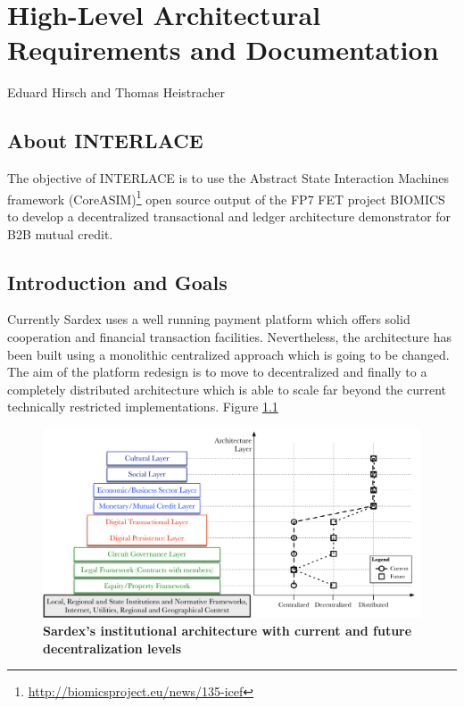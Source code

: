 \chapter{High-Level Architectural Requirements and Documentation}
\label{ch:archreq}

\vspace{-1cm}
\begin{center}
Eduard Hirsch and Thomas Heistracher
\end{center}

\section{About INTERLACE}
The objective of INTERLACE is to use the Abstract State Interaction Machines framework (CoreASIM)\footnote{\url{http://biomicsproject.eu/news/135-icef}} open source output of the FP7 FET project BIOMICS to develop a decentralized transactional and ledger architecture demonstrator for B2B mutual credit.

\section{Introduction and Goals}\label{section-introduction-and-goals}
Currently Sardex uses a well running payment platform which offers solid cooperation and financial transaction facilities. Nevertheless, the architecture has been built using a monolithic centralized approach which is going to be changed. The aim of the platform redesign is to move to decentralized and finally to a completely distributed architecture which is able to scale far beyond the current technically restricted implementations. Figure \ref{decentralizedarchitecture}

\begin{figure}[htbp]
\centering
\includegraphics[width=16cm]{Figures/Sardex_Institutional_Structure_V3}
\caption{\small\textbf{Sardex's institutional architecture with current and future decentralization levels}}
\label{decentralizedarchitecture}
\end{figure}

